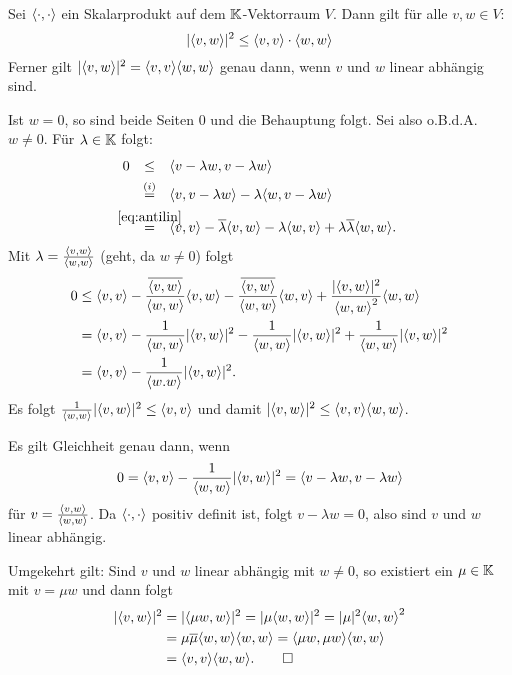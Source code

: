 \begin{satz}
	\label{satz:3.4}
	Sei $\left\langle\cdot,\cdot\right\rangle$ ein Skalarprodukt auf dem $\mathbb{K}$-Vektorraum $V$.
	Dann gilt für alle $v,w \in V$: 
	\[
		\lvert\left\langle v,w\right\rangle\rvert^2 \leq \left\langle v,v\right\rangle \cdot \left\langle w,w\right\rangle
	\]
	Ferner gilt $\abs{\sk{v,w}}^2 = \sk{v,v} \sk{w,w}$ genau dann, wenn $v$ und $w$ linear abhängig sind.
\end{satz}

\begin{beweis}
	Ist $w = 0$, so sind beide Seiten $0$ und die Behauptung folgt.
	Sei also o.B.d.A. $w \neq 0$.
	Für $\lambda \in \mathbb{K}$ folgt:
	\begin{align*}
		0 &\stack{}{\leq} \sk{v-\lambda w, v - \lambda w} \\
		&\stack{(i)}{=} \sk{v,v-\lambda w} - \lambda \sk{w,v-\lambda w} \\
		&\stack{\eqref{eq:antilin}}{=} \sk{v,v} - \ol{\lambda} \sk{v,w} - \lambda \sk{w,v} + \lambda \ol{\lambda} \sk{w,w}.
	\end{align*}
	Mit $\lambda = \frac{\left\langle v,w\right\rangle}{\left\langle w,w\right\rangle}$ (geht, da $w \neq 0$) folgt
	\begin{align*}
		0 &\leq \sk{v,v} - \frac{\ol{\sk{v,w}}}{\sk{w,w}} \sk{v,w} - \frac{\ol{\sk{v,w}}}{\sk{w,w}} \sk{w,v} + \frac{\abs{\sk{v,w}}^2}{\sk{w,w}^2} \sk{w,w} \\
		&= \sk{v,v} - \frac{1}{\sk{w,w}} \abs{\sk{v,w}}^2 - \frac{1}{\sk{w,w}} \abs{\sk{v,w}}^2 + \frac{1}{\sk{w,w}} \abs{\sk{v,w}}^2 \\
		&= \sk{v,v} - \frac{1}{\sk{w.w}} \abs{\sk{v,w}}^2.
	\end{align*}
	Es folgt $\frac{1}{\left\langle w,w\right\rangle} \lvert\left\langle v,w\right\rangle\rvert^2 \leq \left\langle v,v\right\rangle$ und damit $\abs{\sk{v,w}}^2 \leq \sk{v,v} \sk{w,w}$.
	
	Es gilt Gleichheit genau dann, wenn
	\[
		0 = \left\langle v,v\right\rangle - \frac{1}{\left\langle w,w\right\rangle} \lvert\left\langle v,w\right\rangle\rvert^2 = \left\langle v- \lambda w, v-\lambda w\right\rangle
	\]
	für $v = \frac{\left\langle v,w\right\rangle}{\left\langle w,w\right\rangle}$.
	Da $\left\langle\cdot,\cdot\right\rangle$ positiv definit ist, folgt $v - \lambda w = 0$, also sind $v$ und $w$ linear abhängig.
	
	Umgekehrt gilt:
	Sind $v$ und $w$ linear abhängig mit $w \neq 0$, so existiert ein $\mu \in \mathbb{K}$ mit $v = \mu w$ und dann folgt
	\begin{align*}
		\abs{\sk{v,w}}^2 &= \abs{\sk{\mu w,w}}^2 = \abs{\mu \sk{w,w}}^2 = \abs{\mu}^2 \sk{w,w}^2 \\
		&= \mu \ol{\mu} \sk{w,w} \sk{w,w} = \sk{\mu w, \mu w} \sk{w,w} \\
		&= \sk{v,v} \sk{w,w}. \qedhere
	\end{align*}
\end{beweis}

